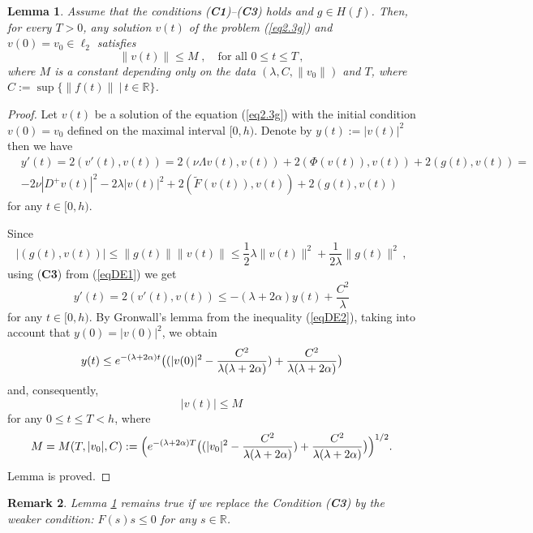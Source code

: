 \documentclass{amsart}%
\newtheorem{lemma}{Lemma}[section]
\newtheorem{remark}[lemma]{Remark}
\begin{document}
\begin{lemma}\label{lBC1} Assume that the conditions (\textbf{C1})--(\textbf{C3}) holds and $g \in H(f)$.
Then, for every $T > 0$, any solution $v(t)$ of the problem
(\ref{eq2.3g}) and $v(0)=v_0 \in \ell_{2}$ satisfies
\[
\|v(t)\| \le M \;,\quad \text{for all } 0 \le t \le T\,,
\]
where $M$ is a constant depending only on the data $(\lambda, C,
\|v_0\|)$ and $T$, where $C:=\sup\{\|f(t)\|\ | \ t\in \mathbb
R\}$.
\end{lemma}
\begin{proof} Let $v(t)$ be a solution of the equation
(\ref{eq2.3g}) with the initial condition $v(0)=v_0$ defined on
the maximal interval $[0,h)$. Denote by $y(t):=|v(t)|^{2}$ then we
have
\begin{eqnarray}\label{eqDE1}
& y'(t)=2(v'(t),v(t))=2(\nu \Lambda
v(t),v(t))+2(\Phi(v(t)),v(t))+2(g(t),v(t))= \nonumber \\
& -2\nu |D^{+}v(t)|^{2}-2\lambda
|v(t)|^{2}+2(\tilde{F}(v(t)),v(t))+2(g(t),v(t))
\end{eqnarray}
for any $t\in [0,h)$.

Since
\[
|(g(t),v(t))| \le \|g(t)\|\|v(t)\| \le \frac{1}{2}\lambda
\|v(t)\|^2 + \frac{1}{2\lambda}\|g(t)\|^2\,,
\]
using (\textbf{C3}) from (\ref{eqDE1}) we get
\begin{equation}\label{eqDE2}
y'(t)=2(v'(t),v(t)) \le -(\lambda +2\alpha)y(t)+
\frac{C^{2}}{\lambda}
\end{equation}
for any $t\in [0,h)$. By Gronwall's lemma from the inequality
(\ref{eqDE2}), taking into account that $y(0)=|v(0)|^{2}$, we
obtain
\begin{equation}\label{eqDE3}
y(t)\le e^{-(\lambda
+2\alpha)t}\big{(}(|v(0)|^{2}-\frac{C^{2}}{\lambda (\lambda
+2\alpha)})+\frac{C^{2}}{\lambda (\lambda
+2\alpha)}\big{)}\nonumber
\end{equation}
and, consequently,
\begin{equation}\label{eqDE4}
|v(t)|\le M \nonumber
\end{equation}
for any $0\le t\le T<h$, where
\begin{equation}\label{eqDE5}
M=M(T,|v_0|,C):=\Big{(}e^{-(\lambda
+2\alpha)T}\big{(}(|v_0|^{2}-\frac{C^{2}}{\lambda (\lambda
+2\alpha)})+\frac{C^{2}}{\lambda (\lambda
+2\alpha)}\big{)}\Big{)}^{1/2}.\nonumber
\end{equation}
Lemma is proved.
\end{proof}

\begin{remark}\label{remDC1} Lemma \ref{lBC1} remains true if we
replace the Condition (\textbf{C3}) by the weaker condition:
$F(s)s\le 0$ for any $s\in \mathbb R$.
\end{remark}
\end{document}
